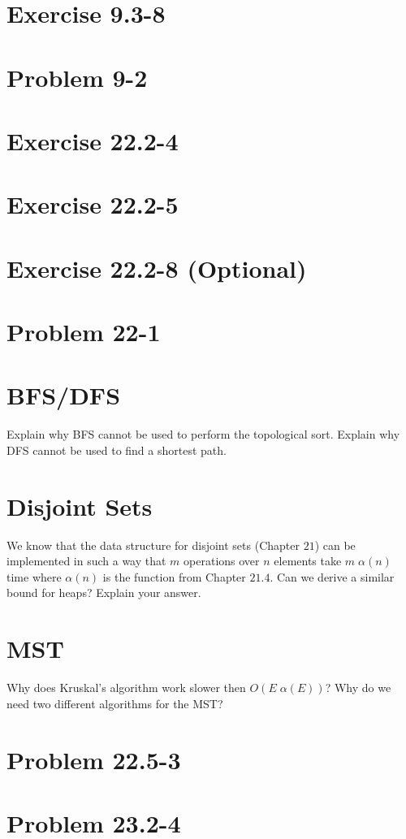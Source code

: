 \documentclass[letterpaper, 11pt]{article}
\begin{document}
\section{Exercise 9.3-8}
 
\section{Problem 9-2}

\section{Exercise 22.2-4}

\section{Exercise 22.2-5}

\section{Exercise 22.2-8 (Optional)}

\section{Problem 22-1}

\section{BFS/DFS}
Explain why BFS cannot be used to perform the topological sort.
Explain why DFS cannot be used to find a shortest path.

\section{Disjoint Sets}
We know that the data structure for disjoint sets (Chapter $21$) can be implemented in such a way that $m$ operations over $n$ elements take $m \;\alpha(n)$ time 
where $\alpha(n)$ is the function from Chapter $21.4$.
Can we derive a similar bound for heaps? 
Explain your answer.

\section{MST}
Why does Kruskal's algorithm work slower then $O(E\;\alpha(E))$?
Why do we need two different algorithms for the MST?

\section{Problem 22.5-3}

\section{Problem 23.2-4}
\end{document}
